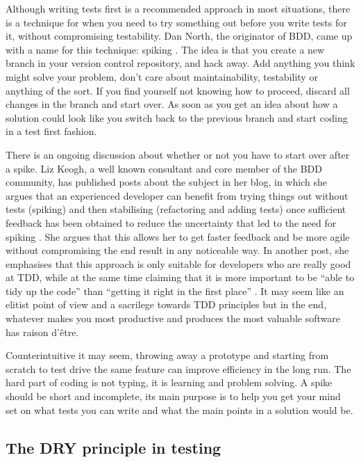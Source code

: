 \documentclass[11pt]{article}
\begin{document}
Although writing tests first is a recommended approach in most situations, there is a technique for when you need to try something out before you write tests for it, without compromising testability. Dan North, the originator of BDD, came up with a name for this technique: spiking \cite{TwitterDanNorth}. The idea is that you create a new branch in your version control repository, and hack away. Add anything you think might solve your problem, don't care about maintainability, testability or anything of the sort. If you find yourself not knowing how to proceed, discard all changes in the branch and start over. As soon as you get an idea about how a solution could look like you switch back to the previous branch and start coding in a test first fashion. \cite[question~59]{Edelstam}

There is an ongoing discussion about whether or not you have to start over after a spike. Liz Keogh, a well known consultant and core member of the BDD community, has published posts about the subject in her blog, in which she argues that an experienced developer can benefit from trying things out without tests (spiking) and then stabilising (refactoring and adding tests) once sufficient feedback has been obtained to reduce the uncertainty that led to the need for spiking \cite{Liz1}. She argues that this allows her to get faster feedback and be more agile without compromising the end result in any noticeable way. In another post, she emphasises that this approach is only suitable for developers who are really good at TDD, while at the same time claiming that it is more important to be ``able to tidy up the code'' than ``getting it right in the first place'' \cite{Liz2}. It may seem like an elitist point of view and a sacrilege towards TDD principles but in the end, whatever makes you most productive and produces the most valuable software has raison d'être.

Counterintuitive it may seem, throwing away a prototype and starting from scratch to test drive the same feature can improve efficiency in the long run. The hard part of coding is not typing, it is learning and problem solving. A spike should be short and incomplete, its main purpose is to help you get your mind set on what tests you can write and what the main points in a solution would be. \cite[question~60]{Edelstam}

\subsection{The DRY principle in testing}
\end{document}
